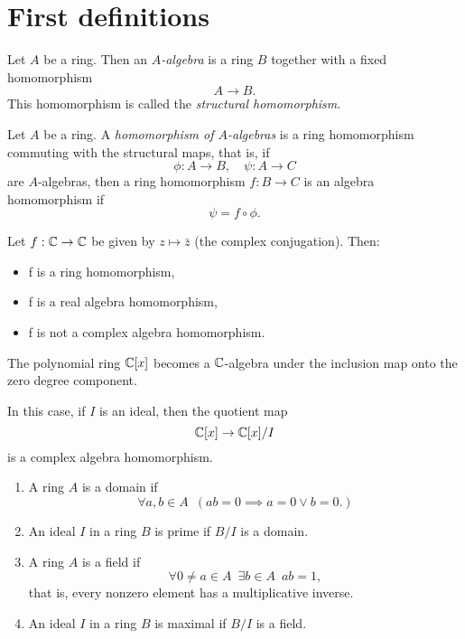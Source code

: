 \section{First definitions}

\begin{df}
  Let $A$ be a ring. Then an \textit{$A$-algebra} is a ring $B$ together with a fixed homomorphism
  \[A \to B.\]
  This homomorphism is called the \textit{structural homomorphism}.
\end{df}

\begin{df}
  Let $A$ be a ring. A \textit{homomorphism of $A$-algebras} is a ring homomorphism commuting with the structural maps, that is, if
  \[ \phi: A \to B, \quad \psi: A \to C\]
  are $A$-algebras, then a ring homomorphism
  $f:B \to C$
  is an algebra homomorphism if
  \[\psi = f \circ \phi.\]
\end{df}

\begin{example}
  Let $f: \mathbb C \to \mathbb C$ be given by $z \mapsto \bar z$ (the complex conjugation). Then:
\begin{itemize}
\item f is a ring homomorphism,
\item f is a real algebra homomorphism,
\item f is not a complex algebra homomorphism.
\end{itemize}
\end{example}

\begin{example}
  The polynomial ring $\mathbb C [x]$ becomes a $\mathbb C$-algebra under the inclusion map onto the zero degree component.

  In this case, if $I$ is an ideal, then 
  the quotient map
  \[ \mathbb C[x] \to \mathbb C[x]/{I}\]
  is a complex algebra homomorphism.
\end{example}

\begin{df}
\mbox{}
\begin{enumerate}
\item A ring $A$ is a domain if
  \[\forall a,b \in A \enspace ( ab = 0 \implies a = 0 \lor b = 0. )\]
\item An ideal $I$ in a ring $B$ is prime if $B/{I}$ is a domain.
\item A ring $A$ is a field if
  \[\forall 0 \neq a \in A \enspace \exists b \in A \enspace ab = 1,\] that is, every nonzero element has a multiplicative inverse.
\item An ideal $I$ in a ring $B$ is maximal if $B/{I}$ is a field.
\end{enumerate}
\end{df}


